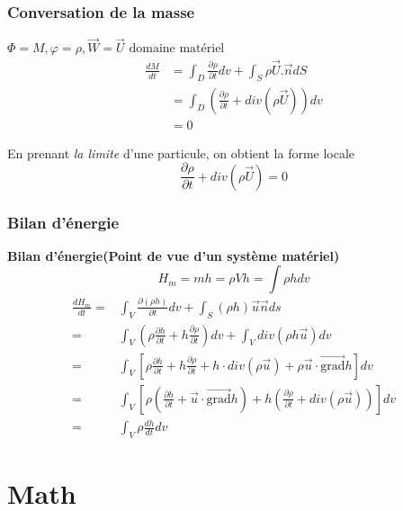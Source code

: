 \subsubsection{Conversation de la masse}
\begin{example}
 $\Phi = M,\varphi=\rho,\vec{ W}=\vec{ U}\text{ domaine mat\'eriel}$
\begin{equation}
	\begin{split}
\frac{ dM}{dt} & =\int_D \frac{\partial \rho}{\partial t}dv+ \int_S \rho \vec{ U}.\vec{ n}dS \\
& = \int_D (\frac{\partial \rho }{\partial t} + div(\rho \vec{ U}))dv \\
& =0	
	\end{split}
\end{equation}

En prenant \emph{la limite} d'une particule, on obtient la forme locale
$$
\frac{\partial \rho }{\partial t} + div(\rho \vec{ U})=0
$$
\end{example}
\subsubsection{Bilan d'\'energie}
\begin{example}
 \textbf{Bilan d'\'energie(Point de vue d'un syst\`eme mat\'eriel)}
 $$H_m = mh=\rho V h=\int \rho h dv$$
 \begin{equation}
 	\begin{split}
	 \frac{ dH_m}{dt}
	 = & \int_V \frac{\partial (\rho h)}{\partial t}dv+ \int_S (\rho h)\vec{u}\vec{n}ds \\
	 = & \int_V (\rho \frac{\partial h}{\partial t}+ h \frac{ \partial \rho}{\partial t})dv+ \int_V div(\rho h\vec{u})dv \\
	 = & \int_V [\rho \frac{\partial h}{\partial t}+ h \frac{ \partial \rho}{\partial t}+ h\cdot div(\rho \vec{u}) +\rho\vec{u}\cdot \vec{\mbox{grad}} h]dv \\
	 = & \int_V [\rho ( \frac{\partial h}{\partial t} + \vec{u}\cdot \vec{\mbox{grad}} h )+ h (\frac{ \partial \rho}{\partial t}+ div(\rho \vec{u}))]dv \\
	 = & \int_V \rho \frac{ dh}{dt}dv
	\end{split}
\end{equation}
\end{example}
\section{Math}

